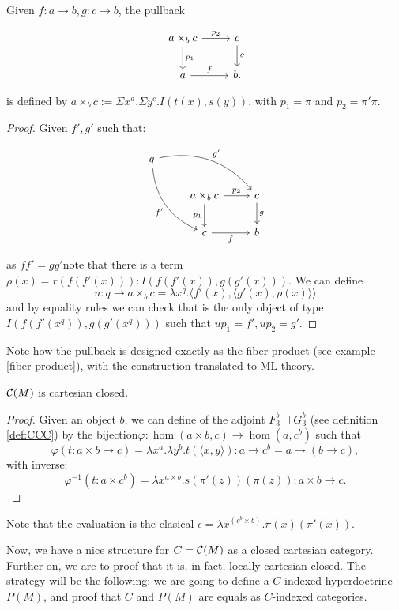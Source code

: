 \begin{proposition}
  Given $f:a\to b, g:c\to b$, the pullback
  \[
    \begin{tikzpicture}
      \node {\begin{tikzcd}
          a\times_b c \ar[d,"p_1"]\ar[r,"p_2"] & c\ar[d,"g"]\\
          a\ar[r,"f"] &   b.
        \end{tikzcd}};
    \end{tikzpicture}
  \]
  is defined by $a\times_b c := \Sigma x^a. \Sigma y^c. I(t(x),s(y))$, with $p_1=\pi$ and $p_2=\pi'\pi$.
\end{proposition}
\begin{proof}
  Given $f',g'$ such that:

  
\[
  \begin{tikzcd}
    q
    \arrow[bend left]{drr}{g'}
    \arrow[bend right,swap]{ddr}{f'} & & \\
    & a\times_{b}c \arrow{r}{p_2} \arrow{d}[swap]{p_1} & c \arrow{d}{g} \\
    & c \arrow[swap]{r}{f}   & b
  \end{tikzcd}
\]

as $ff' = gg'$note that there is a term $\rho(x) = r(f(f'(x))) : I(f(f'(x)), g(g'(x)))$. We can define $$u: q\to a\times_b c = \lambda x^q. \langle f'(x),\langle g'(x),\rho(x)\rangle\rangle$$
and by equality rules we can check that is the only object of type $I(f(f'(x^q)), g(g'(x^q)))$ such that $up_1 = f',up_2=g'$.
\end{proof}
\begin{remark}
Note how the pullback is designed exactly as the fiber product (see example \ref{fiber-product}), with the construction translated to ML theory.
\end{remark}

\begin{proposition}\label{prop:CM2}
$\mathcal{C}(M)$ is cartesian closed.
\end{proposition}
\begin{proof}
  Given an object $b$, we can define of the adjoint $F_3^b\dashv G_3^b$ (see definition \ref{def:CCC}) by the bijection$\varphi: \hom(a\times b, c) \to \hom(a, c^b)$ such that
  $$\varphi(t:a\times b\to c) = \lambda x^a.\lambda y^b. t(\langle x,y\rangle) : a\to c^b = a\to (b\to c),$$
  with inverse:
  $$\varphi^{-1}(t:a\times c^b) = \lambda x^{a\times b}. s(\pi'(z))(\pi(z)) : a\times b\to c.$$
\end{proof}
\begin{remark}
  Note that the evaluation is the clasical $\epsilon  = \lambda x^{(c^b\times b)}.\pi(x)(\pi'(x))$.
\end{remark}
Now, we have a nice structure for $C=\mathcal{C}(M)$ as a closed cartesian category. Further on, we are to proof that it is, in fact, locally cartesian closed.  The strategy will be the following:  we are going to define a $C$-indexed hyperdoctrine $P(M)$, and proof that $C$ and $P(M)$ are equals as $C$-indexed categories.

